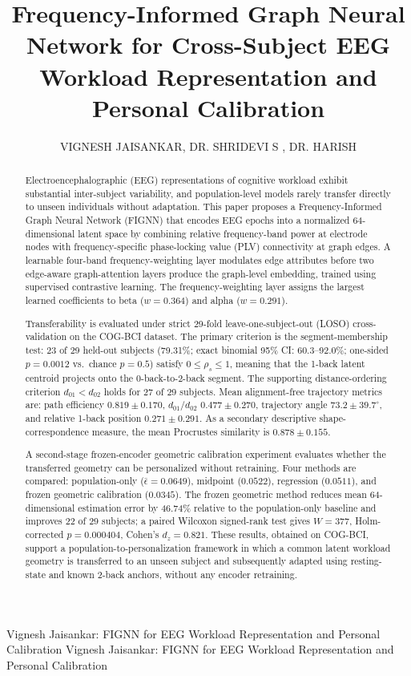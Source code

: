 \documentclass{ieeeaccess}
\begin{document}
\title{Frequency-Informed Graph Neural Network for Cross-Subject EEG
       Workload Representation and Personal Calibration}

\author{
\uppercase{Vignesh Jaisankar},
\uppercase{Dr. Shridevi S },
\uppercase{Dr. Harish}
}

\address[1]{Centre for Neuroinformatics, Vellore Institute of Technology,
            Chennai, India}

\markboth
{Vignesh Jaisankar: FIGNN for EEG Workload Representation and Personal Calibration}
{Vignesh Jaisankar: FIGNN for EEG Workload Representation and Personal Calibration}

\begin{abstract}
Electroencephalographic (EEG) representations of cognitive workload
exhibit substantial inter-subject variability, and population-level models
rarely transfer directly to unseen individuals without adaptation. This paper
proposes a Frequency-Informed Graph Neural Network (FIGNN) that encodes EEG
epochs into a normalized 64-dimensional latent space by combining relative
frequency-band power at electrode nodes with frequency-specific phase-locking
value (PLV) connectivity at graph edges. A learnable four-band
frequency-weighting layer modulates edge attributes before two edge-aware
graph-attention layers produce the graph-level embedding, trained using
supervised contrastive learning. The frequency-weighting layer assigns the
largest learned coefficients to beta ($w=0.364$) and alpha ($w=0.291$).

Transferability is evaluated under strict 29-fold leave-one-subject-out
(LOSO) cross-validation on the COG-BCI dataset. The primary criterion is
the segment-membership test: 23 of 29 held-out subjects (79.31\%; exact
binomial 95\% CI: 60.3--92.0\%; one-sided $p=0.0012$ vs.\ chance $p=0.5$)
satisfy $0\leq\rho_s\leq1$, meaning that the 1-back latent centroid projects
onto the 0-back-to-2-back segment. The supporting distance-ordering criterion
$d_{01}<d_{02}$ holds for 27 of 29 subjects. Mean alignment-free trajectory
metrics are: path efficiency $0.819\pm0.170$, $d_{01}/d_{02}$
$0.477\pm0.270$, trajectory angle $73.2\pm39.7^{\circ}$, and relative 1-back
position $0.271\pm0.291$. As a secondary descriptive shape-correspondence
measure, the mean Procrustes similarity is $0.878\pm0.155$.

A second-stage frozen-encoder geometric calibration experiment evaluates
whether the transferred geometry can be personalized without retraining.
Four methods are compared: population-only ($\bar{\epsilon}=0.0649$),
midpoint ($0.0522$), regression ($0.0511$), and frozen geometric calibration
($0.0345$). The frozen geometric method reduces mean 64-dimensional estimation
error by 46.74\% relative to the population-only baseline and improves 22
of 29 subjects; a paired Wilcoxon signed-rank test gives $W=377$,
Holm-corrected $p=0.000404$, Cohen's $d_z=0.821$. These results, obtained
on COG-BCI, support a population-to-personalization framework in which a
common latent workload geometry is transferred to an unseen subject and
subsequently adapted using resting-state and known 2-back anchors, without
any encoder retraining.
\end{abstract}
\end{document}
